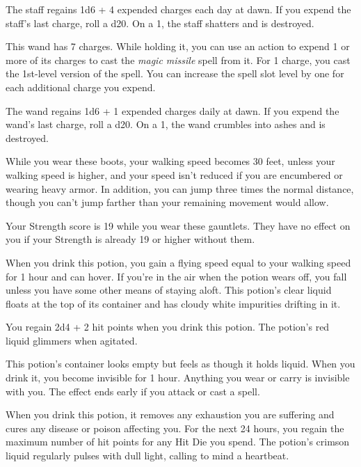 \documentclass[10pt,a4paper,twoside,bg=print,twocolumn,openany,nodeprecatedcode]{dndbook}
\begin{document}
The staff regains 1d6 + 4 expended charges each day at dawn. If you expend the staff's last charge, roll a d20. On a 1, the staff shatters and is destroyed.

This wand has 7 charges. While holding it, you can use an action to expend 1 or more of its charges to cast the \textit{magic missile} spell from it. For 1 charge, you cast the 1st-level version of the spell. You can increase the spell slot level by one for each additional charge you expend.

The wand regains 1d6 + 1 expended charges daily at dawn. If you expend the wand's last charge, roll a d20. On a 1, the wand crumbles into ashes and is destroyed.

While you wear these boots, your walking speed becomes 30 feet, unless your walking speed is higher, and your speed isn't reduced if you are encumbered or wearing heavy armor. In addition, you can jump three times the normal distance, though you can't jump farther than your remaining movement would allow.

Your Strength score is 19 while you wear these gauntlets. They have no effect on you if your Strength is already 19 or higher without them.

When you drink this potion, you gain a flying speed equal to your walking speed for 1 hour and can hover. If you're in the air when the potion wears off, you fall unless you have some other means of staying aloft. This potion's clear liquid floats at the top of its container and has cloudy white impurities drifting in it.

You regain 2d4 + 2 hit points when you drink this potion. The potion's red liquid glimmers when agitated.

This potion's container looks empty but feels as though it holds liquid. When you drink it, you become invisible for 1 hour. Anything you wear or carry is invisible with you. The effect ends early if you attack or cast a spell.

When you drink this potion, it removes any exhaustion you are suffering and cures any disease or poison affecting you. For the next 24 hours, you regain the maximum number of hit points for any Hit Die you spend. The potion's crimson liquid regularly pulses with dull light, calling to mind a heartbeat.
\end{document}
